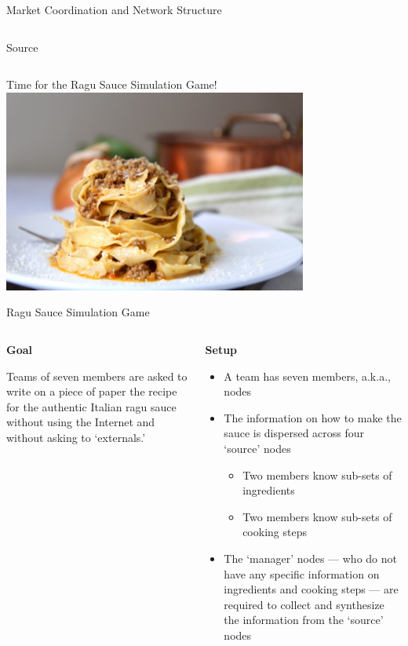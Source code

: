 \documentclass[notes, aspectratio=1610]{beamer}
\begin{document}
\begin{frame}{Market Coordination and Network Structure}
\begin{columns}[c]
\begin{column}{0.5\textwidth}
			\footnotesize Source~\cite[][page 852]{baker_faulkner_1993}

		\end{column}
	\end{columns}
\end{frame}

\begin{frame}{Time for the Ragu Sauce Simulation Game!}{}
	\centering
	\includegraphics[width=0.75\textwidth]{images/pasta_ragu.jpeg}
\end{frame}

\begin{frame}{Ragu Sauce Simulation Game}{}
	\small
	\begin{columns}[t]
		\begin{column}{0.4\textwidth}
			\begin{center}
			\textbf{Goal}
		        \end{center}
			Teams of seven members are asked to write on a piece of 
			paper the recipe for the authentic Italian ragu sauce
			without using the Internet and without asking
			to `externals.'
		\end{column}
		\begin{column}{0.6\textwidth}
			\begin{center}
			\textbf{Setup}
			\end{center}
			\begin{itemize}
				\item A team has seven members, a.k.a., nodes
				\item The information on how to make the sauce is
				dispersed across four `source' nodes 
				\begin{itemize}
					\item Two members know sub-sets of ingredients 
					\item Two members know sub-sets of cooking steps
				\end{itemize}
				\item The `manager' nodes --- who do not have 
				any specific information on ingredients and 
				cooking steps --- are required to collect 
				and synthesize the information from the `source' 
				nodes
			\end{itemize}
		\end{column}
	\end{columns}
\end{frame}
\end{document}
